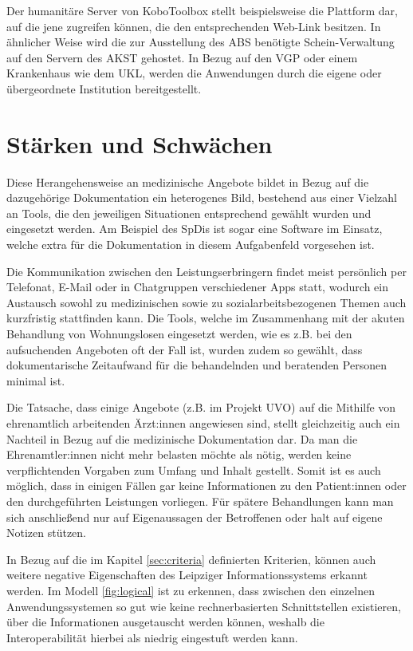 Der humanitäre Server von KoboToolbox stellt beispielsweise die Plattform dar, auf die jene zugreifen können, die den entsprechenden Web-Link besitzen. In ähnlicher Weise wird die zur Ausstellung des \ac{ABS} benötigte Schein-Verwaltung auf den Servern des \ac{AKST} gehostet. In Bezug auf den \ac{VGP} oder einem Krankenhaus wie dem \ac{UKL}, werden die Anwendungen durch die eigene oder übergeordnete Institution bereitgestellt.


\section{Stärken und Schwächen}\label{sec:analysis}

Diese Herangehensweise an medizinische Angebote bildet in Bezug auf die dazugehörige Dokumentation ein heterogenes Bild, bestehend aus einer Vielzahl an Tools, die den jeweiligen Situationen entsprechend gewählt wurden und eingesetzt werden. Am Beispiel des \acp{SpDi} ist sogar eine Software im Einsatz, welche extra für die Dokumentation in diesem Aufgabenfeld vorgesehen ist.

Die Kommunikation zwischen den Leistungserbringern findet meist persönlich per Telefonat, E-Mail oder in Chatgruppen verschiedener Apps statt, wodurch ein Austausch sowohl zu medizinischen sowie zu sozialarbeitsbezogenen Themen auch kurzfristig stattfinden kann. Die Tools, welche im Zusammenhang mit der akuten Behandlung von Wohnungslosen eingesetzt werden, wie es z.B. bei den aufsuchenden Angeboten oft der Fall ist, wurden zudem so gewählt, dass dokumentarische Zeitaufwand für die behandelnden und beratenden Personen minimal ist.

Die Tatsache, dass einige Angebote (z.B. im Projekt \ac{UVO}) auf die Mithilfe von ehrenamtlich arbeitenden Ärzt:innen angewiesen sind, stellt gleichzeitig auch ein Nachteil in Bezug auf die medizinische Dokumentation dar. Da man die Ehrenamtler:innen nicht mehr belasten möchte als nötig, werden keine verpflichtenden Vorgaben zum Umfang und Inhalt gestellt. Somit ist es auch möglich, dass in einigen Fällen gar keine Informationen zu den Patient:innen oder den durchgeführten Leistungen vorliegen. Für spätere Behandlungen kann man sich anschließend nur auf Eigenaussagen der Betroffenen oder halt auf eigene Notizen stützen.

In Bezug auf die im Kapitel \ref{sec:criteria} definierten Kriterien, können auch weitere negative Eigenschaften des Leipziger Informationssystems erkannt werden. Im Modell \ref{fig:logical} ist zu erkennen, dass zwischen den einzelnen Anwendungssystemen so gut wie keine rechnerbasierten Schnittstellen existieren, über die Informationen ausgetauscht werden können, weshalb die Interoperabilität hierbei als niedrig eingestuft werden kann.

